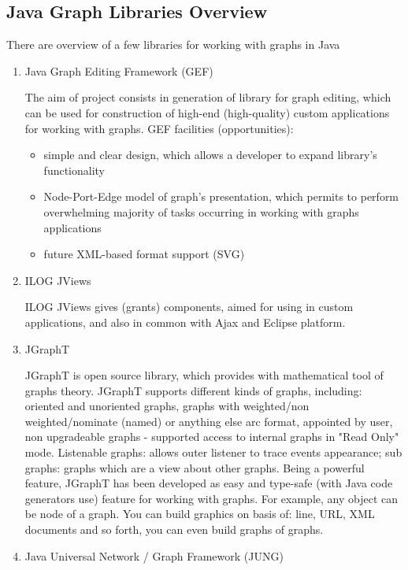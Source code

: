 \documentclass[a4paper,oneside]{article}
\begin{document}
\subsection{Java Graph Libraries Overview}


There are overview of a few libraries for working with graphs in Java

\begin{enumerate}

\item
Java Graph Editing Framework (GEF)~\cite{GEF}

The aim of project consists in generation of library for graph editing, which can be used for construction of high-end (high-quality) custom applications for working with graphs. 
GEF facilities (opportunities):
\begin{itemize}
	\item simple and clear design, which allows a developer to expand library's functionality 
	\item Node-Port-Edge model of graph's presentation, which permits to perform overwhelming majority of tasks occurring in working with graphs applications
	\item future XML-based format support (SVG)
\end{itemize}

\item
ILOG JViews ~\cite{ILOG_Jview}

ILOG JViews gives (grants) components, aimed for using in custom applications, and also in common with Ajax and Eclipse platform.

\item
JGraphT~\cite{JGraphT}

JGraphT is open source library, which provides with mathematical tool of graphs theory. JGraphT supports different kinds of graphs, including: oriented and unoriented graphs, graphs with weighted/non weighted/nominate (named) or anything else arc format, appointed 	by user, non upgradeable graphs - supported access to internal graphs in "Read Only" mode. Listenable graphs: allows outer listener to trace events appearance; sub graphs: graphs which are a view about other graphs. Being a powerful feature, JGraphT has been 	developed as easy and type-safe (with Java code generators use) feature for working with 	graphs. For example, any object can be node of a graph. You can build graphics on basis of: line, URL, XML documents and so forth, you can even build graphs of graphs.

\item
Java Universal Network / Graph Framework (JUNG)~\cite{JUNG}


\end{enumerate}
\end{document}
